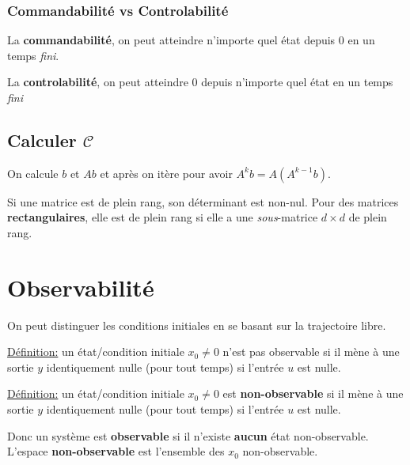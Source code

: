 \documentclass{report}
\begin{document}
\subsubsection{Commandabilité vs Controlabilité}
La \textbf{commandabilité}, on peut atteindre n'importe quel état depuis 0 en un temps \textit{fini}. \par 
La \textbf{controlabilité}, on peut atteindre 0 depuis n'importe quel état en un temps \textit{fini}

\subsection{Calculer $\mathcal{C}$}
On calcule $b$ et $Ab$ et après on itère pour avoir $A^k b = A(A^{k-1} b)$.\par \noindent
Si une matrice est de plein rang, son déterminant est non-nul. Pour des matrices \textbf{rectangulaires}, elle est de plein rang si elle a une \textit{sous}-matrice $d \times d$ de plein rang.

\section{Observabilité}
On peut distinguer les conditions initiales en se basant sur la trajectoire libre.\par \noindent
\underline{Définition:} un état/condition initiale $x_0 \neq 0$ n'est pas observable si il mène à une sortie $y$ identiquement nulle (pour tout temps) si l'entrée $u$ est nulle.\par \noindent
\underline{Définition:} un état/condition initiale $x_0 \neq 0$ est \textbf{non-observable} si il mène à une sortie $y$ identiquement nulle (pour tout temps) si l'entrée $u$ est nulle.\par \noindent
Donc un système est \textbf{observable} si il n'existe \textbf{aucun} état non-observable. L'espace \textbf{non-observable} est l'ensemble des $x_0$ non-observable.
\end{document}
